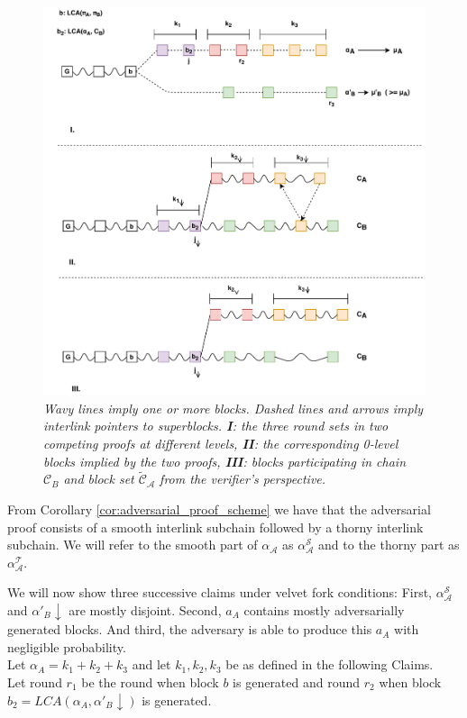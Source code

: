 \begin{figure}[h!]
	\begin{center}
		\includegraphics[scale=0.8]{figures/proof_velvet.pdf}
	\end{center}
	\caption{\textit{ Wavy lines imply one or more blocks. Dashed lines and arrows imply
	interlink pointers to superblocks. \textbf{I}: the three round sets in two competing
	proofs at different levels, \textbf{II}: the corresponding 0-level blocks implied by the two proofs,
	\textbf{III}: blocks participating in chain $\mathcal{C}_B$ and block set $\widetilde{\mathcal{C}}_\mathcal{A}$ from the verifier's perspective.}}	
    \label{fig:proof_velvet}
\end{figure}

From Corollary \ref{cor:adversarial_proof_scheme} we have that the adversarial proof 
consists of a smooth interlink subchain followed by a thorny interlink subchain. We will refer to the smooth part of $\alpha_\mathcal{A}$ as $\alpha^{\mathcal{S}}_\mathcal{A}$ and to the thorny part as $\alpha^{\mathcal{T}}_\mathcal{A}$.   

We will now show three successive claims under velvet fork conditions: First,
$\alpha^{\mathcal{S}}_\mathcal{A}$ and $\alpha'_B \downarrow$ are mostly
disjoint. Second, $a_A$ contains mostly adversarially generated blocks. And third,
the adversary is able to produce this $a_A$ with negligible probability.\\
Let $\alpha_A = k_1 + k_2 + k_3$ and let $k_1, k_2, k_3$ be as defined in the
following Claims.\\
Let round $r_1$ be the round when block $b$ is generated and round $r_2$ when block
$b_2 = LCA(\alpha_A, \alpha'_B\downarrow)$ is generated.\\

